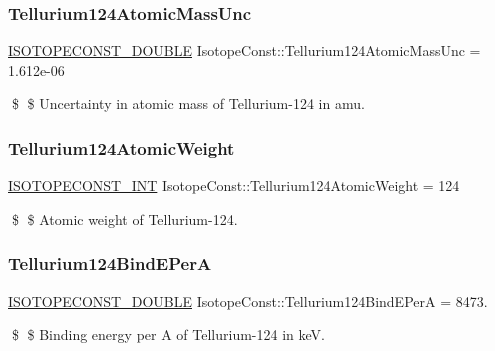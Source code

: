\subsubsection{\texorpdfstring{Tellurium124\+Atomic\+Mass\+Unc}{Tellurium124AtomicMassUnc}}
{\footnotesize\ttfamily \mbox{\hyperlink{group___isotope_const-_macros_ga8f45a7272ce02c0b4c65c44636ed719a}{I\+S\+O\+T\+O\+P\+E\+C\+O\+N\+S\+T\+\_\+\+D\+O\+U\+B\+LE}} Isotope\+Const\+::\+Tellurium124\+Atomic\+Mass\+Unc = 1.\+612e-\/06}

\$ \$ Uncertainty in atomic mass of Tellurium-\/124 in amu. \mbox{\label{group___isotope_const-_tellurium-_te124_ga3782aa4922f42b1e85ca38114cf3f93d}} 
\subsubsection{\texorpdfstring{Tellurium124\+Atomic\+Weight}{Tellurium124AtomicWeight}}
{\footnotesize\ttfamily \mbox{\hyperlink{group___isotope_const-_macros_ga5f18360b3e99483a35c32d789e62621c}{I\+S\+O\+T\+O\+P\+E\+C\+O\+N\+S\+T\+\_\+\+I\+NT}} Isotope\+Const\+::\+Tellurium124\+Atomic\+Weight = 124}

\$ \$ Atomic weight of Tellurium-\/124. \mbox{\label{group___isotope_const-_tellurium-_te124_gaaa9e4bb70bd9358ff78453388e6ea1c7}} 
\subsubsection{\texorpdfstring{Tellurium124\+Bind\+E\+PerA}{Tellurium124BindEPerA}}
{\footnotesize\ttfamily \mbox{\hyperlink{group___isotope_const-_macros_ga8f45a7272ce02c0b4c65c44636ed719a}{I\+S\+O\+T\+O\+P\+E\+C\+O\+N\+S\+T\+\_\+\+D\+O\+U\+B\+LE}} Isotope\+Const\+::\+Tellurium124\+Bind\+E\+PerA = 8473.}

\$ \$ Binding energy per A of Tellurium-\/124 in keV. \mbox{\label{group___isotope_const-_tellurium-_te124_ga77d76e1b20fa0b556a98c99234594357}} 
